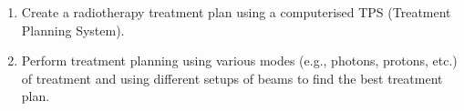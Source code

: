 \begin{enumerate}
    \item Create a radiotherapy treatment plan using a computerised TPS (Treatment Planning System).
    \item Perform treatment planning using various modes (e.g., photons, protons, etc.) of treatment and
using different setups of beams to find the best treatment plan.
\end{enumerate}